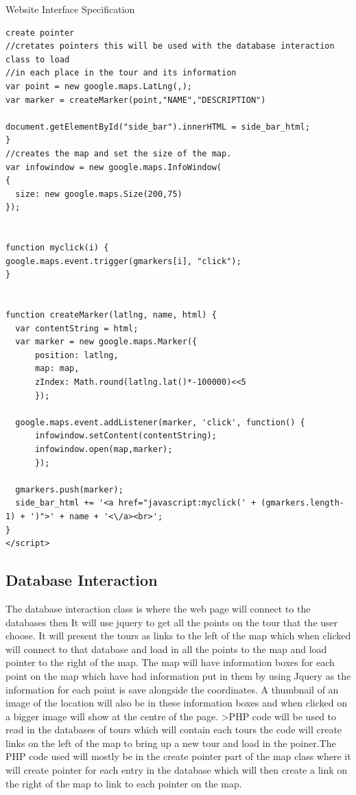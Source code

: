 \documentclass{article}
\begin{document}
\begin{section}{Website Interface Specification}
\begin{lstlisting}[caption=Google Maps API Javascript Example]
create pointer
//cretates pointers this will be used with the database interaction class to load 
//in each place in the tour and its information
var point = new google.maps.LatLng(,);
var marker = createMarker(point,"NAME","DESCRIPTION")

document.getElementById("side_bar").innerHTML = side_bar_html;
}
//creates the map and set the size of the map.
var infowindow = new google.maps.InfoWindow(
{ 
  size: new google.maps.Size(200,75)
});
  

function myclick(i) {
google.maps.event.trigger(gmarkers[i], "click");
}


function createMarker(latlng, name, html) {
  var contentString = html;
  var marker = new google.maps.Marker({
      position: latlng,
      map: map,
      zIndex: Math.round(latlng.lat()*-100000)<<5
      });

  google.maps.event.addListener(marker, 'click', function() {
      infowindow.setContent(contentString); 
      infowindow.open(map,marker);
      });
  
  gmarkers.push(marker);
  side_bar_html += '<a href="javascript:myclick(' + (gmarkers.length-1) + ')">' + name + '<\/a><br>';
}
</script>
\end{lstlisting}

\subsection{Database Interaction}
The database interaction class is where the web page will connect to the databases then It will use jquery to get all the points on the tour that the user choose. It will present the tours as links to the left of the map which when clicked will connect to that database and load in all the points to the map and load pointer to the right of the map. The map will have information boxes for each point on the map which have had information put in them by using Jquery as the information for each point is save alongside the coordinates. A thumbnail of an image of the location will also be in these information boxes and when clicked on a bigger image will show at the centre of the page.
>PHP code will be used to read in the databases of tours which will contain each tours the code will create links on the left of the map to bring up a new tour and load in the poiner.The PHP code used  will mostly be in the create pointer part of the map class where it will create pointer for each entry in the database which will then create a link on the right of the map to link to each pointer on the map.

\end{section}
\end{document}
